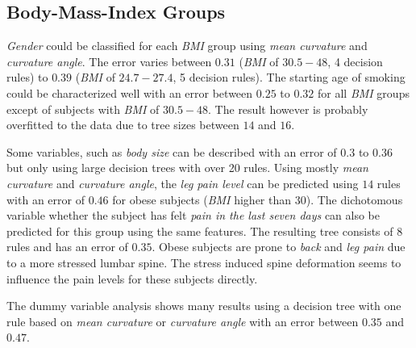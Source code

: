 \documentclass[a4paper,twoside]{style/article}
\newcommand{\com}[1]{\textcolor{orange}{\uline{#1}}}
\begin{document}
\subsection{Body-Mass-Index Groups}
\emph{Gender} could be classified for each \emph{BMI} group using \emph{mean curvature} and \emph{curvature angle}.
The error varies between $0.31$ (\emph{BMI} of \emph{$30.5-48$}, 4 decision rules) to $0.39$ (\emph{BMI} of \emph{$24.7-27.4$}, 5 decision rules).
The starting age of smoking could be characterized well with an error between $0.25$ to $0.32$ for all \emph{BMI} groups except of subjects with \emph{BMI} of \emph{$30.5-48$}.
The result however is probably overfitted to the data due to tree sizes between $14$ and $16$.

Some variables, such as \emph{body size} can be described with an error of $0.3$ to $0.36$ but only using large decision trees with over 20 rules.
Using mostly \emph{mean curvature} and \emph{curvature angle}, the \emph{leg pain level} can be predicted using $14$ rules with an error of $0.46$ for obese subjects (\emph{BMI} higher than $30$).
The dichotomous variable whether the subject has felt \emph{pain in the last seven days} can also be predicted for this group using the same features.
The resulting tree consists of $8$ rules and has an error of $0.35$.
Obese subjects are prone to \emph{back} and \emph{leg pain} due to a more stressed lumbar spine.
The stress induced spine deformation seems to influence the pain levels for these subjects directly.

The dummy variable analysis shows many results using a decision tree with one rule based on \emph{mean curvature} or \emph{curvature angle} with an error between $0.35$ and $0.47$.
\end{document}

